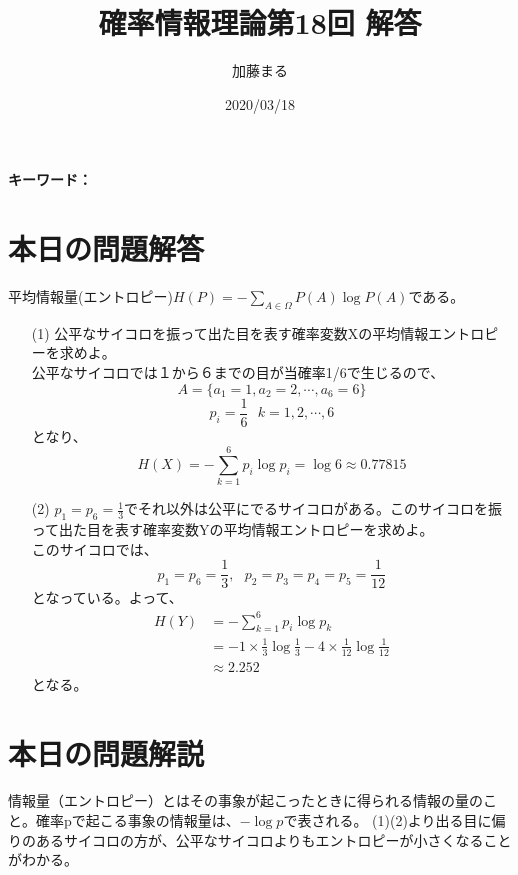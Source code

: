 \documentclass[a4j,uplatex,dvipdfmx]{jsarticle}
\title{確率情報理論第18回 解答}
\author{加藤まる}
\date{2020/03/18}
\begin{document}
\maketitle
\bf キーワード：
\rm

\section*{本日の問題解答}
平均情報量(エントロピー)$H(P)=-\sum_{A\in \Omega} P(A)\log{P(A)}$である。
\begin{itemize}
  \item[(1)]公平なサイコロを振って出た目を表す確率変数Xの平均情報エントロピーを求めよ。\\
   公平なサイコロでは１から６までの目が当確率1/6で生じるので、
   \begin{equation}
     A=\{ a_1=1,a_2=2,\cdots,a_6=6 \}
   \end{equation}
   \begin{equation}
     p_i=\frac{1}{6}~~~k=1,2,\cdots,6
   \end{equation}
   となり、
   \begin{equation}
     H(X)=-\sum_{k=1}^6 p_i \log{p_i} =\log{6}\approx 0.77815
   \end{equation}

  \item[(2)]$p_1=p_6=\frac{1}{3}$でそれ以外は公平にでるサイコロがある。このサイコロを振って出た目を表す確率変数Yの平均情報エントロピーを求めよ。\\
  このサイコロでは、
  \begin{equation}
    p_1=p_6=\frac{1}{3},~~~p_2=p_3=p_4=p_5=\frac{1}{12}
  \end{equation} 
  となっている。よって、
  \begin{equation}
    \begin{split}
      H(Y)&=-\sum_{k=1}^6 p_i \log{p_k}\\
      &=-1\times \frac{1}{3}\log{\frac{1}{3}}-4\times \frac{1}{12}\log{\frac{1}{12}}\\
      &\approx 2.252
    \end{split}
  \end{equation}
  となる。
\end{itemize}


\section*{本日の問題解説}
情報量（エントロピー）とはその事象が起こったときに得られる情報の量のこと。確率pで起こる事象の情報量は、$-\log{p}$で表される。
(1)(2)より出る目に偏りのあるサイコロの方が、公平なサイコロよりもエントロピーが小さくなることがわかる。
\end{document}
